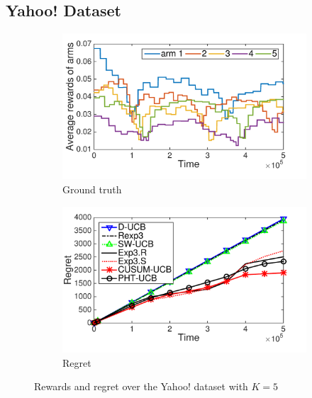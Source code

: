 \documentclass[letterpaper]{article}
\begin{document}
\subsection{Yahoo! Dataset}
\begin{figure}[t]
\centering
\begin{subfigure}[b]{0.45\textwidth}
    \includegraphics[width=\textwidth]{Yahoo_groundtruth}
     \caption{Ground truth}\label{subfig:truth}
\end{subfigure}
\begin{subfigure}[b]{0.45\textwidth}
    \includegraphics[width=\textwidth]{Yahoo_result_NIPS}
     \caption{Regret}\label{subfig:result}
\end{subfigure}
\caption{Rewards and regret over the Yahoo! dataset with $K=5$}
\label{fig:yahoo}
\end{figure}
\end{document}
